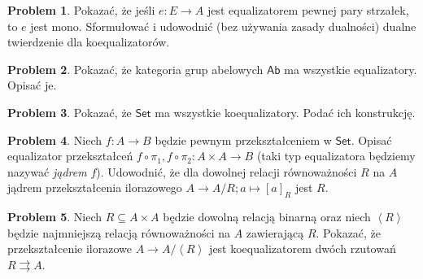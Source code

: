 \documentclass[10pt]{amsart}
\theoremstyle{plain}
\theoremstyle{definition}
\newtheorem{problem}{Problem}
\numberwithin{equation}{section}
\begin{document}
\begin{problem}
Pokazać, że jeśli $e:E\to A$ jest equalizatorem pewnej pary strzałek, to $e$ jest mono. Sformułować i udowodnić (bez używania zasady dualności) dualne twierdzenie dla koequalizatorów. 
\end{problem}

\begin{problem}
Pokazać, że kategoria grup abelowych $\mathsf{Ab}$ ma wszystkie equalizatory. Opisać je.  
\end{problem}

\begin{problem}
Pokazać, że $\mathsf{Set}$ ma wszystkie koequalizatory. Podać ich konstrukcję.
\end{problem}
\begin{problem}
Niech $f:A\to B$ będzie pewnym przekształceniem w $\mathsf{Set}$. Opisać equalizator przekształceń $f\circ \pi_1, f\circ \pi_2:A\times A\to B$ (taki typ equalizatora będziemy nazywać \emph{jądrem} $f$). Udowodnić, że dla dowolnej relacji równoważności $R$ na $A$ jądrem  przekształcenia ilorazowego $A\to A/R; a\mapsto [a]_R$ jest $R$.
\end{problem}
\begin{problem}
Niech $R\subseteq A\times A$ będzie dowolną relacją binarną oraz niech $\left < R\right >$ będzie najmniejszą relacją równoważności na $A$ zawierającą $R$. Pokazać, że przekształcenie ilorazowe $A\to A/\left < R \right >$ jest koequalizatorem dwóch rzutowań $R\rightrightarrows A$. 
\end{problem}
\end{document}
